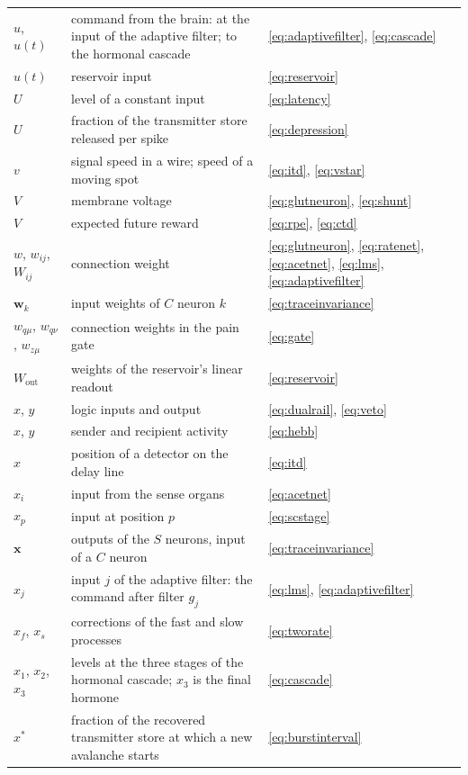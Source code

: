\begin{center}
\begin{longtable}{>{\raggedright}p{2.0cm}>{\raggedright}p{9.6cm}>{\raggedright\arraybackslash}p{2.4cm}}
$u$, $u(t)$ & command from the brain: at the input of the adaptive filter; to the hormonal cascade & \eqref{eq:adaptivefilter}, \eqref{eq:cascade} \\
$u(t)$ & reservoir input & \eqref{eq:reservoir} \\
$U$ & level of a constant input & \eqref{eq:latency} \\
$U$ & fraction of the transmitter store released per spike & \eqref{eq:depression} \\
$v$ & signal speed in a wire; speed of a moving spot & \eqref{eq:itd}, \eqref{eq:vstar} \\
$V$ & membrane voltage & \eqref{eq:glutneuron}, \eqref{eq:shunt} \\
$V$ & expected future reward & \eqref{eq:rpe}, \eqref{eq:ctd} \\
$w$, $w_{ij}$, $W_{ij}$ & connection weight & \eqref{eq:glutneuron}, \eqref{eq:ratenet}, \eqref{eq:acetnet}, \eqref{eq:lms}, \eqref{eq:adaptivefilter} \\
$\mathbf w_k$ & input weights of $C$ neuron $k$ & \eqref{eq:traceinvariance} \\
$w_{q\mu}$, $w_{q\nu}$, $w_{z\mu}$ & connection weights in the pain gate & \eqref{eq:gate} \\
$W_{\text{out}}$ & weights of the reservoir's linear readout & \eqref{eq:reservoir} \\
$x$, $y$ & logic inputs and output & \eqref{eq:dualrail}, \eqref{eq:veto} \\
$x$, $y$ & sender and recipient activity & \eqref{eq:hebb} \\
$x$ & position of a detector on the delay line & \eqref{eq:itd} \\
$x_i$ & input from the sense organs & \eqref{eq:acetnet} \\
$x_p$ & input at position $p$ & \eqref{eq:scstage} \\
$\mathbf x$ & outputs of the $S$ neurons, input of a $C$ neuron & \eqref{eq:traceinvariance} \\
$x_j$ & input $j$ of the adaptive filter: the command after filter $g_j$ & \eqref{eq:lms}, \eqref{eq:adaptivefilter} \\
$x_f$, $x_s$ & corrections of the fast and slow processes & \eqref{eq:tworate} \\
$x_1$, $x_2$, $x_3$ & levels at the three stages of the hormonal cascade; $x_3$ is the final hormone & \eqref{eq:cascade} \\
$x^*$ & fraction of the recovered transmitter store at which a new avalanche starts & \eqref{eq:burstinterval} \\

\end{longtable}
\end{center}
